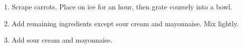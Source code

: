 
\begin{ingredients}
\end{ingredients}


\begin{recipe}
  \begin{enumerate}
  \item Scrape carrots.  Place on ice for an hour, then grate coursely into a bowl.

  \item Add remaining ingredients except sour cream and mayonnaise.  Mix lightly.

  \item Add sour cream and mayonnaise.

  \end{enumerate}
\end{recipe}
